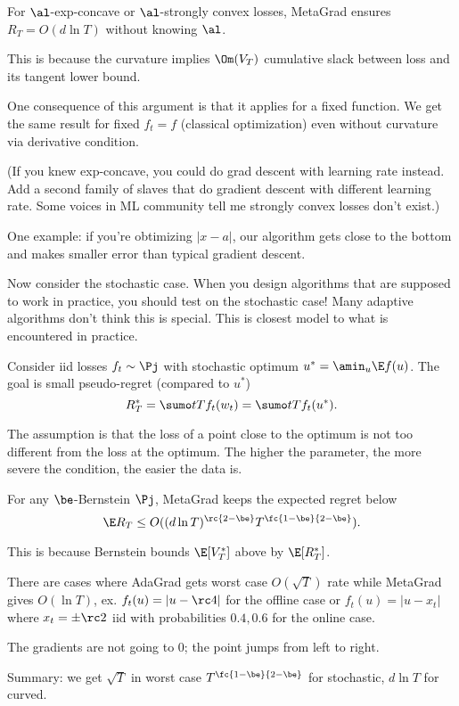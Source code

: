 \begin{cor}
For $\al$-exp-concave or $\al$-strongly convex losses, MetaGrad ensures $R_T=O(d\ln T)$ without knowing $\al$. 
\end{cor}
This is because the curvature implies $\Om(V_T)$ cumulative slack between loss and its tangent lower bound.

One consequence of this argument is that it applies for a fixed function. We get the same result for fixed $f_t=f$ (classical optimization) even without curvature via derivative condition. 

(If you knew exp-concave, you could do grad descent with learning rate instead. Add a second family of slaves that do gradient descent with different learning rate. Some voices in ML community tell me strongly convex losses don't exist.)

One example: if you're obtimizing $|x-a|$, our algorithm gets close to the bottom and makes smaller error than typical gradient descent.

Now consider the stochastic case. When you design algorithms that are supposed to work in practice, you should test on the stochastic case! Many adaptive algorithms don't think this is special. This is closest model to what is encountered in practice.

Consider iid losses $f_t\sim \Pj$ with stochastic optimum $u^*=\amin_u \E f(u)$. The goal is small pseudo-regret (compared to $u^*$)
$$
R_T^* = \sumo tT f_t(w_t) = \sumo tT f_t(u^*).
$$

The assumption is that the loss of a point close to the optimum is not too different from the loss at the optimum. The higher the parameter, the more severe the condition, the easier the data is.
\begin{cor}
For any $\be$-Bernstein $\Pj$, MetaGrad keeps the expected regret below
$$
\E R_T \le O((d\ln T)^{\rc{2-\be}} T^{\fc{1-\be}{2-\be}}).
$$
\end{cor}
This is because Bernstein bounds $\E[V_T^*]$ above by $\E[R_T^*]$. 

There are cases where AdaGrad gets worst case $O(\sqrt T)$ rate while MetaGrad gives $O(\ln T)$, ex. $f_t(u) = |u-\rc 4|$ for the offline case or $f_t(u) = |u-x_t|$ where $x_t=\pm \rc2$ iid with probabilities $0.4,0.6$ for the online case.

The gradients are not going to 0; the point jumps from left to right. 

Summary: we get $\sqrt T$ in worst case $T^{\fc{1-\be}{2-\be}}$ for stochastic, $d\ln T$ for curved.

